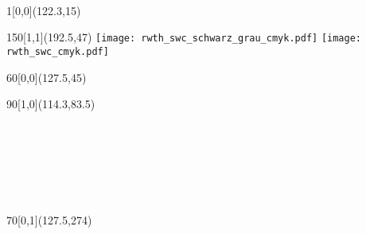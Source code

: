 \begin{titlepage}
  ~ %

  \begin{textblock}{1}[0,0](122.3,15)
    \noindent
    \ifisbw
    \else
    \fi
  \end{textblock}
	\begin{textblock}{150}[1,1](192.5,47)
    \noindent\flushright\noindent
    \ifisbw
      \texttt{[image: rwth\_swc\_schwarz\_grau\_cmyk.pdf]}
    \else
      \texttt{[image: rwth\_swc\_cmyk.pdf]}
    \fi
	\end{textblock}

  \begin{textblock}{60}[0,0](127.5,45)
    \noindent\flushleft
    \\[.5\baselineskip]
  \end{textblock}

  \begin{textblock}{90}[1,0](114.3,83.5)
    \begin{minipage}[!c][140mm][c]{90mm}
      \noindent\flushright
      \noindent{\textsc{\THESISTYPE}}\\[2\baselineskip]

      {
        \noindent{\LARGE{\textbf{\TITLEENG}}}\\[1\baselineskip]
        \noindent{\LARGE{\TITLEGER}}
      }\\[2\baselineskip]

      \\[.5\baselineskip]
      \noindent{\textbf{{\AUTHOR}}}\\[2\baselineskip]
      
    \end{minipage}
  \end{textblock}


  \begin{textblock}{70}[0,1](127.5,274)
    \noindent\flushleft
    \\[.5\baselineskip]
    \noindent{{\REVIEWERONE}}\\[.5\baselineskip]
    \noindent{{\REVIEWERTWO}}\\[2\baselineskip]

    \\[.5\baselineskip]
    \noindent{{\SUPERVISOR}}
  \end{textblock}

\end{titlepage} 